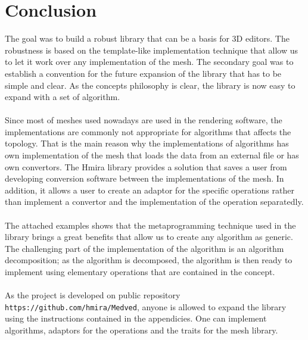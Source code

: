 \chapter*{Conclusion}

The goal was to build a robust library that can be a basis for 3D editors. The robustness
is based on the template-like implementation technique that allow us to let it work over
any implementation of the mesh. The secondary goal was to establish a convention
for the future expansion of the library that has to be simple and clear. As the
concepts philosophy is clear, the library is now easy to expand with a set of algorithm.\\
\\
Since most of meshes used nowadays are used in the rendering software, the implementations
are commonly not appropriate for algorithms that affects the topology. That is the main reason
why the implementations of algorithms has own implementation of the mesh that loads the
data from an external file or has own convertors. The Hmira library provides a 
solution that saves a user from developing conversion software between the implementations of the mesh.
In addition, it allows a user to create an adaptor for the specific operations
rather than implement a convertor and the implementation of the operation separatedly.\\
\\
The attached examples shows that the metaprogramming technique used in the library brings a great
benefits that allow us to create any algorithm as generic. The challenging part of the implementation
of the algorithm is an algorithm decomposition; as the algorithm is decomposed, the algorithm
is then ready to implement using elementary operations that are contained in the concept.\\
\\
As the project is developed on public repository \texttt{https://github.com/hmira/Medved},
anyone is allowed to expand the library using the instructions contained in the appendicies.
One can implement algorithms, adaptors for the operations and the traits for the
mesh library.